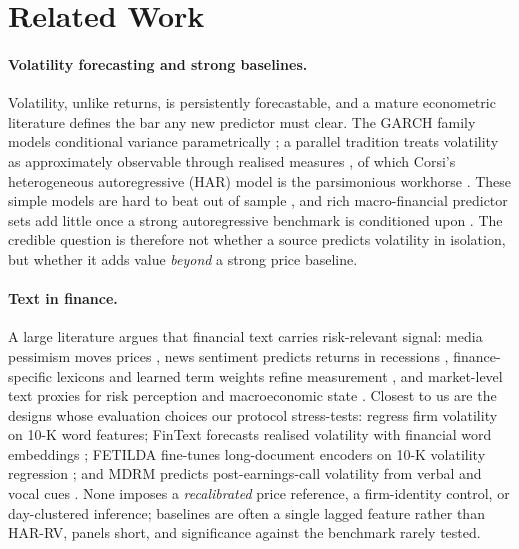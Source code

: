 \section{Related Work}
\label{sec:related}

\paragraph{Volatility forecasting and strong baselines.}
Volatility, unlike returns, is persistently forecastable, and a mature econometric literature defines the bar any new predictor must clear. The GARCH family models conditional variance parametrically \citep{engle1982arch,bollerslev1986garch,nelson1991egarch}; a parallel tradition treats volatility as approximately observable through realised measures \citep{andersen2003modeling}, of which Corsi's heterogeneous autoregressive (HAR) model is the parsimonious workhorse \citep{corsi2009har}. These simple models are hard to beat out of sample \citep{hansen2005garch,poon2003forecasting}, and rich macro-financial predictor sets add little once a strong autoregressive benchmark is conditioned upon \citep{paye2012dejavol}. The credible question is therefore not whether a source predicts volatility in isolation, but whether it adds value \emph{beyond} a strong price baseline.

\paragraph{Text in finance.}
A large literature argues that financial text carries risk-relevant signal: media pessimism moves prices \citep{tetlock2007giving}, news sentiment predicts returns in recessions \citep{garcia2013sentiment}, finance-specific lexicons and learned term weights refine measurement \citep{loughran2011liability,loughran2016survey,jegadeesh2013word}, and market-level text proxies for risk perception and macroeconomic state \citep{manela2017nvix,bybee2024business}. Closest to us are the designs whose evaluation choices our protocol stress-tests: \citet{kogan2009predicting} regress firm volatility on 10-K word features; FinText forecasts realised volatility with financial word embeddings \citep{rahimikia2021fintext}; FETILDA fine-tunes long-document encoders on 10-K volatility regression \citep{fetilda2022}; and MDRM predicts post-earnings-call volatility from verbal and vocal cues \citep{qin2019mdrm}. None imposes a \emph{recalibrated} price reference, a firm-identity control, or day-clustered inference; baselines are often a single lagged feature rather than HAR-RV, panels short, and significance against the benchmark rarely tested.

